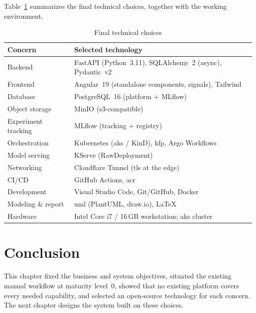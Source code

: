 \medskip
Table~\ref{tab:software} summarizes the final technical choices, together with
the working environment.

\begin{table}[H]\centering
\renewcommand{\arraystretch}{1.2}
\caption{Final technical choices}\label{tab:software}
\small
\begin{tabularx}{\textwidth}{|>{\raggedright\arraybackslash}p{4.2cm}|X|}
\hline
\rowcolor{primary!15}
\textbf{Concern} & \textbf{Selected technology}\\
\hline
Backend             & FastAPI (Python~3.11), SQLAlchemy~2 (async), Pydantic~v2\\
\hline
Frontend            & Angular~19 (standalone components, signals), Tailwind\\
\hline
Database            & PostgreSQL~16 (platform + MLflow)\\
\hline
Object storage      & MinIO (\gls{s3}-compatible)\\
\hline
Experiment tracking & MLflow (tracking + registry)\\
\hline
Orchestration       & Kubernetes (\gls{aks} / KinD), \gls{kfp}, Argo Workflows\\
\hline
Model serving       & KServe (RawDeployment)\\
\hline
Networking          & Cloudflare Tunnel (\gls{tls} at the edge)\\
\hline
CI/CD               & GitHub Actions, \gls{acr}\\
\hline
Development         & Visual Studio Code, Git/GitHub, Docker\\
\hline
Modeling \& report  & \gls{uml} (PlantUML, draw.io), \LaTeX\\
\hline
Hardware            & Intel Core i7 / 16\,GB workstation; \gls{aks} cluster\\
\hline
\end{tabularx}
\end{table}

\section{Conclusion}
This chapter fixed the business and system objectives, situated the existing
manual workflow at maturity level~0, showed that no existing platform covers
every needed capability, and selected an open-source technology for each
concern. The next chapter designs the system built on these choices.
